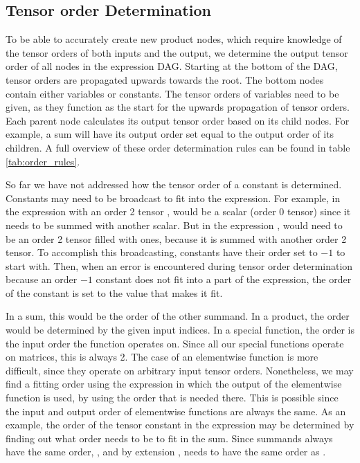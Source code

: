 \documentclass[12pt, a4paper]{report}
\begin{document}
\subsection{Tensor order Determination}
To be able to accurately create new product nodes, which require knowledge of the tensor orders of both inputs and the output, we determine the output tensor order of all nodes in the expression DAG.
Starting at the bottom of the DAG, tensor orders are propagated upwards towards the root.
The bottom nodes contain either variables or constants.
The tensor orders of variables need to be given, as they function as the start for the upwards propagation of tensor orders.
Each parent node calculates its output tensor order based on its child nodes.
For example, a sum will have its output order set equal to the output order of its children.
A full overview of these order determination rules can be found in table \ref{tab:order_rules}.

So far we have not addressed how the tensor order of a constant is determined.
Constants may need to be broadcast to fit into the expression.
For example, in the expression  with an order 2 tensor ,  would be a scalar (order 0 tensor) since it needs to be summed with another scalar.
But in the expression ,  would need to be an order 2 tensor filled with ones, because it is summed with another order 2 tensor.
To accomplish this broadcasting, constants have their order set to $-1$ to start with.
Then, when an error is encountered during tensor order determination because an order $-1$ constant does not fit into a part of the expression, the order of the constant is set to the value that makes it fit.

In a sum, this would be the order of the other summand.
In a product, the order would be determined by the given input indices.
In a special function, the order is the input order the function operates on. Since all our special functions operate on matrices, this is always 2.
The case of an elementwise function is more difficult, since they operate on arbitrary input tensor orders.
Nonetheless, we may find a fitting order using the expression in which the output of the elementwise function is used, by using the order that is needed there.
This is possible since the input and output order of elementwise functions are always the same.
As an example, the order of the tensor constant  in the expression  may be determined by finding out what order  needs to be to fit in the sum.
Since summands always have the same order, , and by extension , needs to have the same order as .
\end{document}
